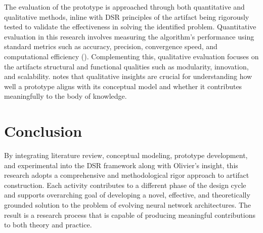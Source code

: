 \parbreak

\noindent The evaluation of the prototype is approached through both quantitative and qualitative methods, inline with DSR principles of the artifact being rigorously tested to validate the effectiveness in solving the identified problem. Quantitative evaluation in this research involves measuring the algorithm's performance using standard metrics such as accuracy, precision, convergence speed, and computational efficiency (\cite{gregar2023research}).  Complementing this, qualitative evaluation focuses on the artifacts structural and functional qualities such as modularity, innovation, and scalability. \cite{olivier2009information} notes that qualitative insights are crucial for understanding how well a prototype aligns with its conceptual model and whether it contributes meaningfully to the body of knowledge.

\section{Conclusion}
By integrating literature review, conceptual modeling, prototype development, and experimental into the DSR framework along with Olivier's insight, this research adopts a comprehensive and methodological rigor approach to artifact construction. Each activity contributes to a different phase of the design cycle and supports overarching goal of developing a novel, effective, and theoretically grounded solution to the problem of evolving neural network architectures. The result is a research process that is capable of producing meaningful contributions to both theory and practice.